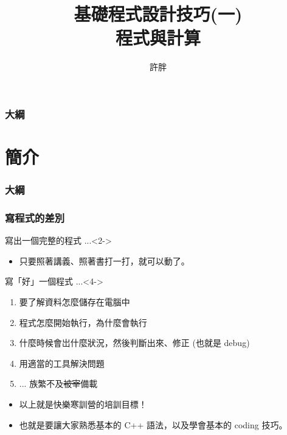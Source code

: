 \documentclass[utf8]{beamer}
\begin{document}
\begin{CJK}{UTF8}{bkai}

\title{基礎程式設計技巧(一)\\程式與計算}
\author{許胖}

\begin{frame}
  \titlepage
\end{frame}
\begin{frame}
  \frametitle{大綱}
  \begin{multicols}{2}
    \tableofcontents
  \end{multicols}
\end{frame}

\section{簡介}
\begin{frame}
  \frametitle{大綱}
  \begin{multicols}{2}
    \tableofcontents[currentsection]
  \end{multicols}
\end{frame}

\begin{frame}
  \frametitle{寫程式的差別}
  \begin{block}{寫出一個完整的程式 ...}<2->
    \begin{itemize}[<3->]
    \item 只要照著講義、照著書打一打，就可以動了。
    \end{itemize}
  \end{block}
  \begin{exampleblock}{寫「好」一個程式 ...}<4->
    \begin{enumerate}
    \item<5-> 要了解資料怎麼儲存在電腦中
    \item<6-> 程式怎麼開始執行，為什麼會執行
    \item<7-> 什麼時候會岀什麼狀況，然後判斷出來、修正 (也就是 debug)
    \item<8-> 用適當的工具解決問題
    \item<9-> ... 族繁不及\sout{被宰}備載
    \end{enumerate}
  \end{exampleblock}
  \begin{itemize}
  \item<10-> 以上就是快樂寒訓營的\alert{培訓目標}！
  \item<11-> 也就是要讓大家熟悉\alert{基本的 C++ 語法}，以及學會基本的 \alert{coding 技巧}。
  \end{itemize}
\end{frame}


\end{CJK}
\end{document}
